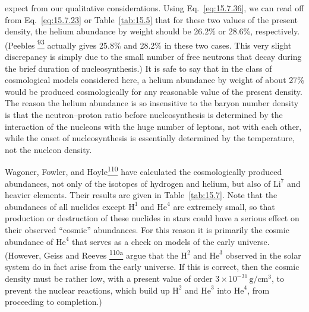expect from our qualitative considerations. Using Eq.~\eqref{eq:15.7.36}, we
can read off from Eq.~\eqref{eq:15.7.23} or Table~\ref{tab:15.5} that for
these two values of the present density, the helium abundance by weight
should be 26.2\% or 28.6\%, respectively. (Peebles%
\hyperref[ch15-ref-93]{\textsuperscript{93}} actually gives 25.8\% and
28.2\% in these two cases. This very slight discrepancy is simply due to the
small number of free neutrons that decay during the brief duration of
nucleosynthesis.) It is safe to say that in the class of cosmological models
considered here, a helium abundance by weight of about 27\% would be produced
cosmologically for any reasonable value of the present density. The reason
the helium abundance is so insensitive to the baryon number density is that
the neutron--proton ratio before nucleosynthesis is determined by the
interaction of the nucleons with the huge number of leptons, not with each
other, while the onset of nucleosynthesis is essentially determined by the
temperature, not the nucleon density.

Wagoner, Fowler, and Hoyle\hyperref[ch15-ref-110]{\textsuperscript{110}}
have calculated the cosmologically produced abundances, not only of the
isotopes of hydrogen and helium, but also of \(\mathrm{Li}^7\) and heavier
elements. Their results are given in Table~\ref{tab:15.7}. Note that the
abundances of all nuclides except \(\mathrm H^1\) and \(\mathrm{He}^4\) are
extremely small, so that production or destruction of these nuclides in stars
could have a serious effect on their observed ``cosmic'' abundances. For this
reason it is primarily the cosmic abundance of \(\mathrm{He}^4\) that serves
as a check on models of the early universe. (However, Geiss and Reeves%
\hyperref[ch15-ref-110a]{\textsuperscript{110a}} argue that the
\(\mathrm H^2\) and \(\mathrm{He}^3\) observed in the solar system do in fact
arise from the early universe. If this is correct, then the cosmic density
must be rather low, with a present value of order
\(3\times10^{-31}\,\mathrm{g/cm^3}\), to prevent the nuclear reactions,
which build up \(\mathrm H^2\) and \(\mathrm{He}^3\) into
\(\mathrm{He}^4\), from proceeding to completion.)

